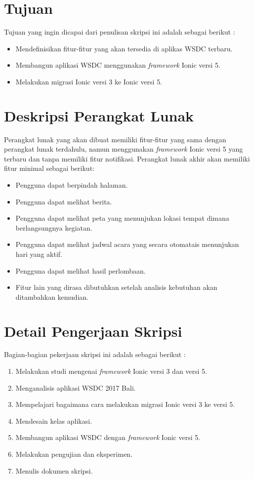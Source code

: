 \documentclass[a4paper,twoside]{article}
\begin{document}
\section{Tujuan}
Tujuan yang ingin dicapai dari penulisan skripsi ini adalah sebagai berikut :
\begin{itemize}
	\item Mendefinisikan fitur-fitur yang akan tersedia di aplikas WSDC terbaru.
	\item Membangun aplikasi WSDC menggunakan {\it framework} Ionic versi 5.
	\item Melakukan migrasi Ionic versi 3 ke Ionic versi 5.
\end{itemize}

\newpage

\section{Deskripsi Perangkat Lunak}
Perangkat lunak yang akan dibuat memiliki fitur-fitur yang sama dengan perangkat lunak terdahulu, namun menggunakan {\it framework} Ionic versi 5 yang terbaru dan tanpa memiliki fitur notifikasi. Perangkat lunak akhir akan memiliki fitur minimal sebagai berikut:
\begin{itemize}
	\item Pengguna dapat berpindah halaman.
	\item Pengguna dapat melihat berita.
	\item Pengguna dapat melihat peta yang menunjukan lokasi tempat dimana berlangsungnya kegiatan.
	\item Pengguna dapat melihat jadwal acara yang secara otomatais menunjukan hari yang aktif.
	\item Pengguna dapat melihat hasil perlombaan.
	\item Fitur lain yang dirasa dibutuhkan setelah analisis kebutuhan akan ditambahkan kemudian.
		
\end{itemize}

\section{Detail Pengerjaan Skripsi}
Bagian-bagian pekerjaan skripsi ini adalah sebagai berikut :
	\begin{enumerate}
		\item Melakukan studi mengenai {\it framework} Ionic versi 3 dan versi 5.
		\item Menganalisis aplikasi WSDC 2017 Bali.
		\item Mempelajari bagaimana cara melakukan migrasi Ionic versi 3 ke versi 5.
		\item Mendesain kelas aplikasi.
		\item Membangun aplikasi WSDC dengan {\it framework} Ionic versi 5. 
		\item Melakukan pengujian dan eksperimen.
		\item Menulis dokumen skripsi.
	\end{enumerate}
\end{document}
